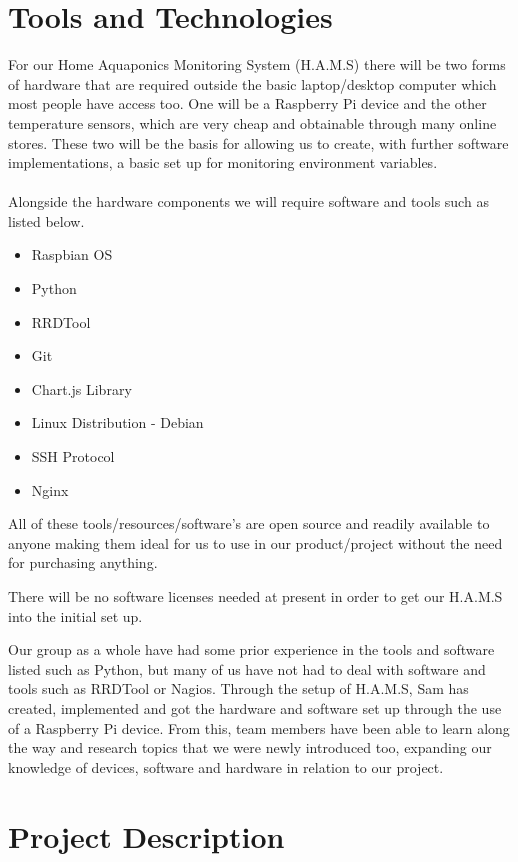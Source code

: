 \documentclass[11pt, oneside, a4paper, titlepage]{article}
\begin{document}


\part{Tools and Technologies}
For our Home Aquaponics Monitoring System (H.A.M.S) there will be two forms of hardware that are required outside the basic laptop/desktop computer which most people have access too. One will be a Raspberry Pi device and the other temperature sensors, which are very cheap and obtainable through many online stores. These two will be the basis for allowing us to create, with further software implementations, a basic set up for monitoring environment variables.  
\\
\\
Alongside the hardware components we will require software and tools such as listed below.  

\begin{itemize}
	\item Raspbian OS
	\item Python
	\item RRDTool
	\item Git
	\item Chart.js Library
	\item Linux Distribution - Debian
	\item SSH Protocol
	\item Nginx
\end{itemize}

All of these tools/resources/software's are open source and readily available to anyone making them ideal for us to use in our product/project without the need for purchasing anything. 

There will be no software licenses needed at present in order to get our H.A.M.S into the initial set up.  

Our group as a whole have had some prior experience in the tools and software listed such as Python, but many of us have not had to deal with software and tools such as RRDTool or Nagios. Through the setup of H.A.M.S, Sam has created, implemented and got the hardware and software set up through the use of a Raspberry Pi device. From this, team members have been able to learn along the way and research topics that we were newly introduced too, expanding our knowledge of devices, software and hardware in relation to our project.  

\part{Project Description}
\end{document}
